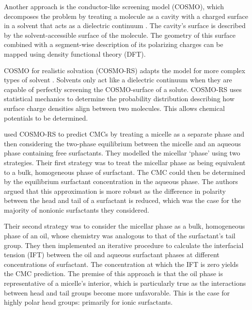
Another approach is the conductor-like screening model (COSMO), which decomposes
the problem by treating a molecule as a cavity with a charged surface in a
solvent that acts as a dielectric continuum \cite{klamtCOSMONewApproach1993}.
The cavity's surface is described by the solvent-accessible surface of the
molecule. The geometry of this surface combined with a segment-wise description
of its polarizing charges can be mapped using density functional theory (DFT).

COSMO for realistic solvation (COSMO-RS) adapts the model for more complex types
of solvent \cite{klamtCOSMORSAlternativeSimulation2010}. Solvents only act like
a dielectric continuum when they are capable of perfectly screening the
COSMO-surface of a solute. COSMO-RS uses statistical mechanics to determine the
probability distribution describing how surface charge densities align between
two molecules. This allows chemical potentials to be determined.

\citet{turchiFirstprinciplesPredictionCritical2022} used COSMO-RS to predict
CMCs by treating a micelle as a separate phase and then considering the
two-phase equilibrium between the micelle and an aqueous phase containing free
surfactants. They modelled the micellar `phase' using two strategies. Their
first strategy was to treat the micellar phase as being equivalent to a bulk,
homogeneous phase of surfactant. The CMC could then be determined by the
equilibrium surfactant concentration in the aqueous phase. The authors argued
that this approximation is more robust as the difference in polarity between the
head and tail of a surfactant is reduced, which was the case for the majority of
nonionic surfactants they considered.

Their second strategy was to consider the micellar phase as a bulk, homogeneous
phase of an oil, whose chemistry was analogous to that of the surfactant's tail
group. They then implemented an iterative procedure to calculate the interfacial
tension (IFT) between the oil and aqueous surfactant phases at different
concentrations of surfactant. The concentration at which the IFT is zero yields
the CMC prediction. The premise of this approach is that the oil phase is
representative of a micelle's interior, which is particularly true as the
interactions between head and tail groups become more unfavorable. This is the
case for highly polar head groups: primarily for ionic surfactants.

